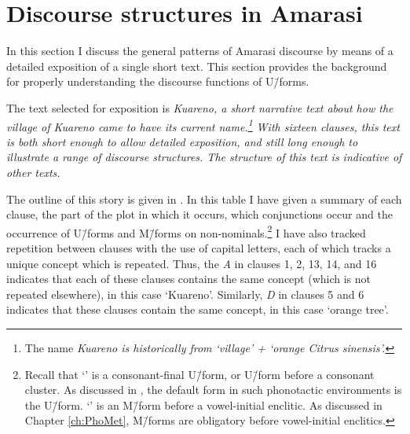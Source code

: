 \section{Discourse structures in Amarasi}\label{sec:DisStrAma}
In this section I discuss the general patterns of Amarasi discourse
by means of a detailed exposition of a single short text.
This section provides the background for properly
understanding the discourse functions of U\=/forms.

The text selected for exposition is \it{Kuareno{\Q}},
a short narrative text about how the village of \it{Kuareno{\Q}}
came to have its current name.\footnote{
	The name \it{Kuareno{\Q}} is historically from
	 `village' +  `orange \it{Citrus sinensis}'.}
With sixteen clauses, this text is both short enough to allow detailed exposition,
and still long enough to illustrate a range of discourse structures.
The structure of this text is indicative of other texts.

The outline of this story is given in .
In this table I have given a summary of each clause,
the part of the plot in which it occurs, which conjunctions occur
and the occurrence of U\=/forms and M\=/forms on non-nominals.\footnote{
		Recall that `{\Ucc}' is a consonant-final U\=/form,
		or U\=/form before a consonant cluster.
		As discussed in ,
		the default form in such phonotactic environments is the U\=/form.
		`{\Mvv}' is an M\=/form before a vowel-initial enclitic.
		As discussed in Chapter \ref{ch:PhoMet}, M\=/forms
		are obligatory before vowel-initial enclitics.}
I have also tracked repetition between clauses with the use of capital letters,
each of which tracks a unique concept which is repeated.
Thus, the \emph{A} in clauses 1, 2, 13, 14, and 16 indicates
that each of these clauses contains the same concept
(which is not repeated elsewhere), in this case  `Kuareno{\Q}'.
Similarly, \emph{D} in clauses 5 and 6 indicates that these clauses
contain the same concept, in this case  `orange tree'.

